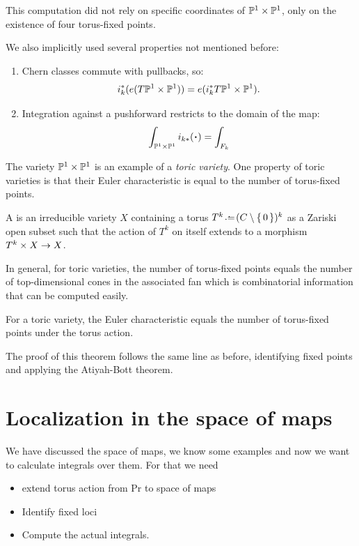 \documentclass[12pt]{memoir}
\begin{document}
\begin{Rmk}
    This computation did not rely on specific coordinates of $\mathbb{P}^1 \times \mathbb{P}^1$, only on the existence of four torus-fixed points.\par
    We also implicitly used several properties not mentioned before:
    \begin{enumerate}
        \item Chern classes commute with pullbacks, so:
        $$i_k^\ast(e(T\mathbb{P}^1\times\mathbb{P}^1))=e(i_k^\ast T\mathbb{P}^1\times\mathbb{P}^1).$$
        \item Integration against a pushforward restricts to the domain of the map:
        $$\int_{\bP^1\x\bP^1}i_{k\ast}(\.)=\int_{F_k}$$
    \end{enumerate}
\end{Rmk}

The variety $\mathbb{P}^1 \times \mathbb{P}^1$ is an example of a \emph{toric variety}. One property of toric varieties is that their Euler characteristic is equal to the number of torus-fixed points.

\begin{Def}
    A  is an irreducible variety $X$ containing a torus $T^k\defeq(C\less\set{0})^k$ as a Zariski open subset such that the action of $T^k$ on itself extends to a morphism $T^k\times X\to X$.
\end{Def}

In general, for toric varieties, the number of torus-fixed points equals the number of top-dimensional cones in the associated fan which is combinatorial information that can be computed easily.

\begin{Th}
For a toric variety, the Euler characteristic equals the number of torus-fixed points under the torus action.
\end{Th}

The proof of this theorem follows the same line as before, identifying fixed points and applying the Atiyah-Bott theorem. 

\section{Localization in the space of maps}

We have discussed the space of maps, we know some examples and now we want to calculate integrals over them. For that we need 
\begin{itemize}
    \item extend torus action from Pr to space of maps
    \item Identify fixed loci 
    \item Compute the actual integrals.
\end{itemize}
\end{document}
